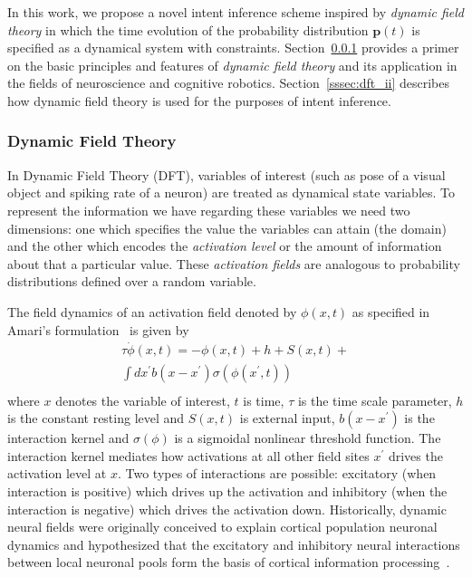 In this work, we propose a novel intent inference scheme inspired by \textit{dynamic field theory} in which the time evolution of the probability distribution $\boldsymbol{p}(t)$ is specified as a dynamical system with constraints. Section~\ref{sssec:dft} provides a primer on the basic principles and features of \textit{dynamic field theory} and its application in the fields of neuroscience and cognitive robotics. Section~\ref{sssec:dft_ii} describes how dynamic field theory is used for the purposes of intent inference. 

\subsubsection{Dynamic Field Theory}\label{sssec:dft}

In Dynamic Field Theory (DFT), variables of interest (such as pose of a visual object and spiking rate of a neuron) are treated as dynamical state variables. To represent the information we have regarding these variables we need two dimensions: one which specifies the value the variables can attain (the domain) and the other which encodes the \textit{activation level} or the amount of information about that a particular value. These \textit{activation fields} are analogous to probability distributions defined over a random variable. 

The field dynamics of an activation field denoted by $\phi(x, t)$ as specified in Amari's formulation~\cite{amari1977dynamics} is given by 
\begin{multline}
\tau\dot{\phi}(x,t) = -\phi(x,t) + h + S(x,t) + \\ \int\limits_{}^{}dx^{\prime}b(x-x^{\prime})\sigma(\phi(x^{\prime}, t)) 
\end{multline} 
where $x$ denotes the variable of interest, $t$ is time, $\tau$ is the time scale parameter, $h$ is the constant resting level and $S(x,t)$ is external input, $b(x-x^\prime)$ is the interaction kernel and $\sigma(\phi)$ is a sigmoidal nonlinear threshold function. The interaction kernel mediates how activations at all other field sites $x^\prime$ drives the activation level at $x$. Two types of interactions are possible: excitatory (when interaction is positive) which drives up the activation and inhibitory (when the interaction is negative) which drives the activation down. 
Historically, dynamic neural fields were originally conceived to explain cortical population neuronal dynamics and hypothesized that the excitatory and inhibitory neural interactions between local neuronal pools form the basis of cortical information processing~\cite{wilson1973mathematical}. 

